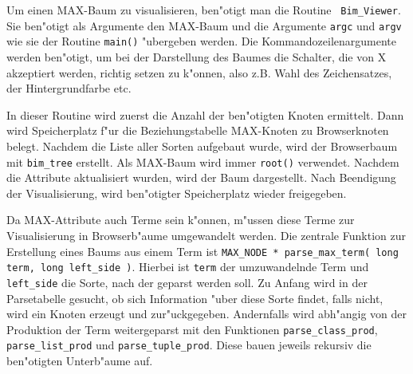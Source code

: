 Um einen MAX-Baum zu visualisieren, ben"otigt man die Routine {\tt 
Bim\_Viewer}. Sie ben"otigt als Argumente den MAX-Baum und die Argumente
{\tt argc} und {\tt argv} wie sie der Routine {\tt main()} "ubergeben werden.
Die Kommandozeilenargumente werden ben"otigt, um bei der Darstellung des
Baumes die Schalter, die von X akzeptiert werden, richtig setzen zu k"onnen,
also z.B. Wahl des Zeichensatzes, der Hintergrundfarbe etc.\par
In dieser Routine wird zuerst die Anzahl der ben"otigten Knoten ermittelt.
Dann wird Speicherplatz f"ur die Beziehungstabelle MAX-Knoten zu Browserknoten
belegt. Nachdem die Liste aller Sorten aufgebaut wurde, wird der Browserbaum
mit {\tt bim\_tree} erstellt. Als MAX-Baum wird immer {\tt root()} verwendet.
Nachdem die Attribute aktualisiert wurden, wird der Baum dargestellt. Nach
Beendigung der Visualisierung, wird ben"otigter Speicherplatz wieder freigegeben.\par

Da MAX-Attribute auch Terme sein k"onnen, m"ussen diese Terme zur 
Visualisierung in Browserb"aume umgewandelt werden. Die zentrale Funktion
zur Erstellung eines Baums aus einem Term ist {\tt MAX\_NODE * parse\_max\_term( long term, long left\_side )}. Hierbei ist {\tt term} der umzuwandelnde
Term und {\tt left\_side} die Sorte, nach der geparst werden soll. Zu 
Anfang wird in der Parsetabelle gesucht, ob sich Information "uber diese
Sorte findet, falls nicht, wird ein Knoten erzeugt und zur"uckgegeben. 
Andernfalls wird abh"angig von der Produktion der Term weitergeparst mit den
Funktionen {\tt parse\_class\_prod}, {\tt parse\_list\_prod} und
{\tt parse\_tuple\_prod}. Diese bauen jeweils rekursiv die ben"otigten
Unterb"aume auf.

